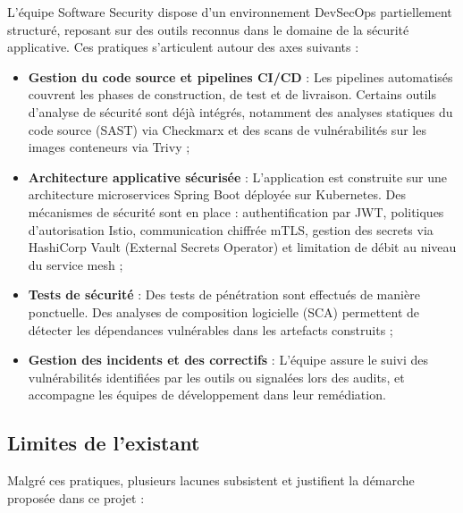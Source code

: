 L'équipe Software Security dispose d'un environnement DevSecOps partiellement structuré, reposant sur des outils reconnus dans le domaine de la sécurité applicative. Ces pratiques s'articulent autour des axes suivants :

\begin{itemize}
    \item \textbf{Gestion du code source et pipelines CI/CD} : Les pipelines automatisés couvrent les phases de construction, de test et de livraison. Certains outils d'analyse de sécurité sont déjà intégrés, notamment des analyses statiques du code source (SAST) via Checkmarx et des scans de vulnérabilités sur les images conteneurs via Trivy ;
    \item \textbf{Architecture applicative sécurisée} : L'application est construite sur une architecture microservices Spring Boot déployée sur Kubernetes. Des mécanismes de sécurité sont en place : authentification par JWT, politiques d'autorisation Istio, communication chiffrée mTLS, gestion des secrets via HashiCorp Vault (External Secrets Operator) et limitation de débit au niveau du service mesh ;
    \item \textbf{Tests de sécurité} : Des tests de pénétration sont effectués de manière ponctuelle. Des analyses de composition logicielle (SCA) permettent de détecter les dépendances vulnérables dans les artefacts construits ;
    \item \textbf{Gestion des incidents et des correctifs} : L'équipe assure le suivi des vulnérabilités identifiées par les outils ou signalées lors des audits, et accompagne les équipes de développement dans leur remédiation.
\end{itemize}

\subsection{Limites de l'existant}

Malgré ces pratiques, plusieurs lacunes subsistent et justifient la démarche proposée dans ce projet :

